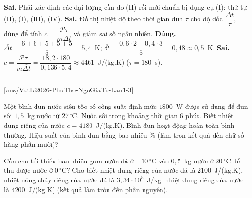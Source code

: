 \begin{ex}
{			\begin{itemchoice}
				\itemch \textbf{Sai.} Phải xác định các đại lượng cần đo (II) rồi mới chuẩn bị dụng cụ (I): thứ tự (II), (I), (III), (IV).
				\itemch \textbf{Sai.} Đồ thị nhiệt độ theo thời gian đun $\tau$ cho độ dốc $\dfrac{\Delta t}{\tau}$, dùng để tính $c=\dfrac{\mathscr{P}\tau}{m\Delta t}$ và giảm sai số ngẫu nhiên.
				\itemch \textbf{Đúng.} $\overline{\Delta t}=\dfrac{6+6+5+5+5}{5}=5{,}4$~K; $\overline{\delta t}=\dfrac{0{,}6\cdot 2+0{,}4\cdot 3}{5}=0{,}48\approx 0{,}5$~K.
				\itemch \textbf{Sai.} $c=\dfrac{\mathscr{P}\tau}{m\overline{\Delta t}}=\dfrac{18{,}2\cdot 180}{0{,}136\cdot 5{,}4}\approx 4461$~J/(kg.K) ($\tau=180$~s).
			\end{itemchoice}
		}
	\end{ex}

	\subsection*{}
	\setcounter{ex}{0}
	[ans/VatLi2026-PhuTho-NgoGiaTu-Lan1-3]

	\begin{ex}%
		Một bình đun nước siêu tốc có công suất định mức $1800$~W được sử dụng để đun sôi $1{,}5$~kg nước từ $27\,^\circ\text{C}$. Nước sôi trong khoảng thời gian $6$ phút. Biết nhiệt dung riêng của nước $c=4180$~J/(kg.K). Bình đun hoạt động hoàn toàn bình thường. Hiệu suất của bình đun bằng bao nhiêu \% (làm tròn kết quả đến chữ số hàng phần mười)?
		\par
	\end{ex}

	\begin{ex}%
		Cần cho tối thiểu bao nhiêu gam nước đá ở $-10\,^\circ\text{C}$ vào $0{,}5$~kg nước ở $20\,^\circ\text{C}$ để thu được nước ở $0\,^\circ\text{C}$? Cho biết nhiệt dung riêng của nước đá là $2100$~J/(kg.K), nhiệt nóng chảy riêng của nước đá là $3{,}34\cdot 10^5$~J/kg, nhiệt dung riêng của nước là $4200$~J/(kg.K) (kết quả làm tròn đến phần nguyên).
		\par
	\end{ex}

